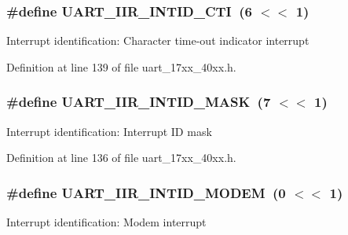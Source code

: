 \subsubsection[{\texorpdfstring{U\+A\+R\+T\+\_\+\+I\+I\+R\+\_\+\+I\+N\+T\+I\+D\+\_\+\+C\+TI}{UART_IIR_INTID_CTI}}]{\setlength{\rightskip}{0pt plus 5cm}\#define U\+A\+R\+T\+\_\+\+I\+I\+R\+\_\+\+I\+N\+T\+I\+D\+\_\+\+C\+TI~(6 $<$$<$ 1)}\hypertarget{group__UART__17XX__40XX_ga965ba229214955385f11277549b7ecce}{}\label{group__UART__17XX__40XX_ga965ba229214955385f11277549b7ecce}
Interrupt identification\+: Character time-\/out indicator interrupt 

Definition at line 139 of file uart\+\_\+17xx\+\_\+40xx.\+h.

\subsubsection[{\texorpdfstring{U\+A\+R\+T\+\_\+\+I\+I\+R\+\_\+\+I\+N\+T\+I\+D\+\_\+\+M\+A\+SK}{UART_IIR_INTID_MASK}}]{\setlength{\rightskip}{0pt plus 5cm}\#define U\+A\+R\+T\+\_\+\+I\+I\+R\+\_\+\+I\+N\+T\+I\+D\+\_\+\+M\+A\+SK~(7 $<$$<$ 1)}\hypertarget{group__UART__17XX__40XX_ga6f78952aec5835ac753718323b681910}{}\label{group__UART__17XX__40XX_ga6f78952aec5835ac753718323b681910}
Interrupt identification\+: Interrupt ID mask 

Definition at line 136 of file uart\+\_\+17xx\+\_\+40xx.\+h.

\subsubsection[{\texorpdfstring{U\+A\+R\+T\+\_\+\+I\+I\+R\+\_\+\+I\+N\+T\+I\+D\+\_\+\+M\+O\+D\+EM}{UART_IIR_INTID_MODEM}}]{\setlength{\rightskip}{0pt plus 5cm}\#define U\+A\+R\+T\+\_\+\+I\+I\+R\+\_\+\+I\+N\+T\+I\+D\+\_\+\+M\+O\+D\+EM~(0 $<$$<$ 1)}\hypertarget{group__UART__17XX__40XX_gaf02dabd5f0b60345c70379ab8df3e899}{}\label{group__UART__17XX__40XX_gaf02dabd5f0b60345c70379ab8df3e899}
Interrupt identification\+: Modem interrupt 

